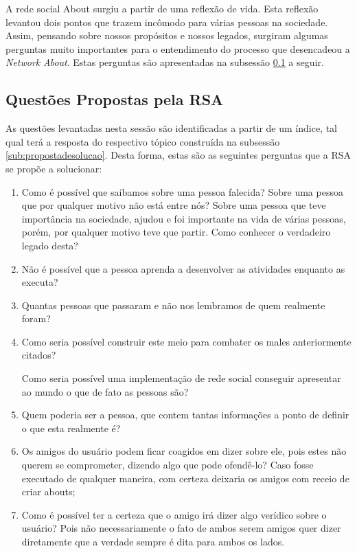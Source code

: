 A rede social About surgiu a partir de uma reflexão de vida. Esta reflexão
levantou dois pontos que trazem incômodo para várias pessoas na sociedade.
Assim, pensando sobre
nossos propósitos e nossos legados, surgiram algumas perguntas muito importantes
para o entendimento do processo que desencadeou a \textit{Network} \textit{About}.
Estas perguntas são apresentadas na subsessão \ref{sub:questoesrsa} a
seguir.


\subsection{Questões Propostas pela RSA}
\label{sub:questoesrsa}
As questões levantadas nesta sessão são identificadas a partir de um índice,
tal qual terá a resposta do respectivo tópico
construída na subsessão \ref{sub:propostadesolucao}. Desta forma, estas
são as seguintes perguntas que a RSA se propõe a solucionar:

\begin{enumerate}
    \item Como é possível que saibamos sobre uma pessoa falecida? Sobre uma pessoa que por 
        qualquer motivo não está entre nós? Sobre uma pessoa que teve importância na 
        sociedade, ajudou e foi importante na vida de várias pessoas, porém, por 
        qualquer motivo teve que partir. Como conhecer o verdadeiro legado desta?
    \item Não é possível que a pessoa aprenda a desenvolver as atividades enquanto as executa?
    \item Quantas pessoas que passaram e não nos lembramos de quem realmente foram?
    \item Como seria possível construir este meio para combater os males anteriormente citados?

        Como seria possível uma implementação de rede social conseguir apresentar ao mundo o que
        de fato as pessoas são?
    \item Quem poderia ser a pessoa, que contem tantas informações a ponto de definir o que esta realmente é?

    \item Os amigos do usuário podem ficar coagidos em dizer sobre ele, pois estes não querem se comprometer,
        dizendo algo que pode ofendê-lo? Caso fosse executado de qualquer maneira, com certeza deixaria os amigos
        com receio de criar abouts;
    \item Como é possível ter a certeza que o amigo irá dizer algo verídico sobre o usuário? Pois não necessariamente o fato
        de ambos serem amigos quer dizer diretamente que a verdade sempre é dita para ambos os lados.
\end{enumerate}


